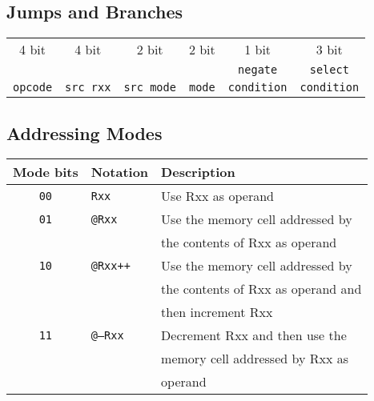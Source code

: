 \documentclass{leaflet}
\begin{document}
  \subsection{Jumps and Branches}
   {\scriptsize
    \begin{center}
     \begin{longtable}{|c||c|c||c||c|c|}
      \hline
      4 bit&4 bit&2 bit&2 bit&1 bit&3 bit\\
      &     &     &     &{\tt negate}&{\tt select}\\
      {\tt opcode}&{\tt src rxx}&{\tt src mode}&
      {\tt mode}&{\tt condition}&{\tt condition}\\
      \hline
     \end{longtable}
    \end{center}
   }
%
  \subsection{Addressing Modes}
   {\scriptsize
    \begin{center}
     \begin{longtable}{|c|l|l|}
      \hline
       Mode bits&Notation&Description\\
      \hline
      \hline
       {\tt 00}&{\tt Rxx}&Use Rxx as operand\\
       {\tt 01}&{\tt @Rxx}&Use the memory cell addressed by\\
               &          &the contents of Rxx as operand\\
       {\tt 10}&{\tt @Rxx++}&Use the memory cell addressed by\\
               &          &the contents of Rxx as operand and\\
               &          &then increment Rxx\\
       {\tt 11}&{\tt @--Rxx}&Decrement Rxx and then use the\\
               &          &memory cell addressed by Rxx as\\
               &          &operand\\
      \hline
     \end{longtable}
    \end{center}
   }
%
\end{document}
